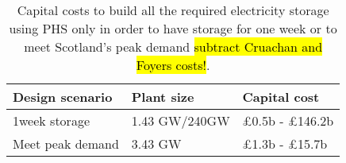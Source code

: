 \begin{table}[htbp]
	\caption{Capital costs to build all the required electricity storage using PHS only in order to have storage for one week or to meet Scotland's peak demand \hl{subtract Cruachan and Foyers costs!}.}
	\label{tbl:costs}
	\centering
		\begin{tabular}{@{}lll@{}}
		\toprule
		Design scenario & Plant size & Capital cost \\ \midrule
		1week storage & 1.43 GW/240GW & £0.5b - £146.2b \\
		Meet peak demand & 3.43 GW & £1.3b - £15.7b \\ \bottomrule
	\end{tabular}
\end{table}